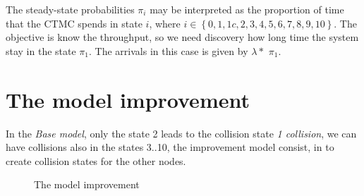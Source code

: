\documentclass[conference]{IEEEtran}
\begin{document}

 
\bigskip 
The steady-state probabilities   \( \pi_{i} \)  may be interpreted as the proportion of time that the CTMC spends in state  \(i \), where  \(i \in \left\{  0, 1,1c, 2,3,4,5,6,7,8,9,10\right\}\).
The objective is know the  throughput, so we need discovery how long time the system stay in the state \( \pi_{ 1 } \). The arrivals in this case is given by \(\lambda*\) \(\pi_{ 1 }\).

\bigskip

\section{The model improvement}

In the \textit{Base model}, only the state 2 leads to the collision state \textit{1 collision}, we can have collisions also in the states 3..10, the improvement model consist, in to create collision states for the other nodes.

\begin{figure}[H]
	\centering	 
	\caption{The model improvement}%
\end{figure}
\end{document}
